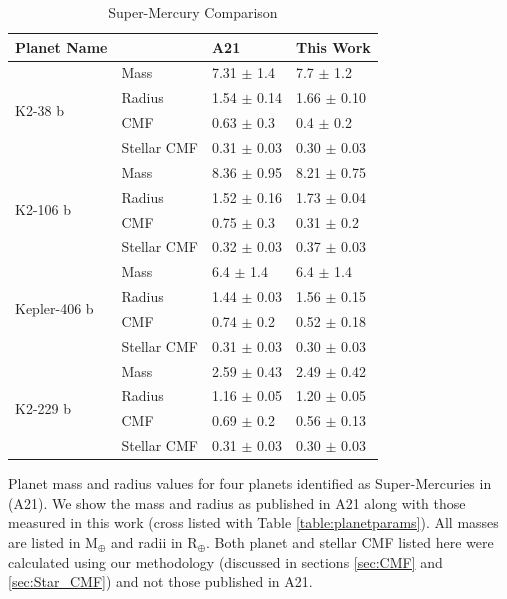 \documentclass[twocolumn]{aastex631}
\begin{document}
\begin{table}[]
\begin{flushleft}

\caption{Super-Mercury Comparison}
\label{table:mercuries}
\begin{tabular}{|l|l|l|l|}
\hline
 Planet Name                  &              & A21         & This Work      \\\hline
 \multirow{4}{*}{K2-38 b}     & Mass         & 7.31 $\pm$ 1.4  & 7.7 $\pm$ 1.2  \\\cline{2-4}
                              & Radius       & 1.54 $\pm$ 0.14 & 1.66 $\pm$ 0.10  \\\cline{2-4}
                              & CMF          & 0.63 $\pm$ 0.3   & 0.4 $\pm$ 0.2    \\\cline{2-4}
                              & Stellar CMF  & 0.31 $\pm$ 0.03 & 0.30 $\pm$ 0.03 \\\hline
\multirow{4}{*}{K2-106 b}     & Mass         & 8.36 $\pm$ 0.95 & 8.21 $\pm$ 0.75  \\\cline{2-4}
                              & Radius       & 1.52 $\pm$ 0.16 & 1.73 $\pm$ 0.04  \\\cline{2-4}
                              & CMF          & 0.75 $\pm$ 0.3  & 0.31  $\pm$ 0.2   \\\cline{2-4}
                              & Stellar CMF  & 0.32 $\pm$ 0.03 & 0.37 $\pm$ 0.03  \\\hline
\multirow{4}{*}{Kepler-406 b} & Mass         & 6.4 $\pm$ 1.4   & 6.4 $\pm$ 1.4 \\\cline{2-4}
                              & Radius       & 1.44 $\pm$ 0.03 & 1.56 $\pm$ 0.15 \\\cline{2-4}
                              & CMF          & 0.74 $\pm$ 0.2  & 0.52 $\pm$ 0.18 \\\cline{2-4}
                              & Stellar CMF  & 0.31 $\pm$ 0.03 & 0.30 $\pm$ 0.03 \\\hline
\multirow{4}{*}{K2-229 b}     & Mass         & 2.59 $\pm$ 0.43 & 2.49 $\pm$ 0.42 \\\cline{2-4}
                              & Radius       & 1.16 $\pm$ 0.05 & 1.20 $\pm$ 0.05\\\cline{2-4}
                              & CMF          & 0.69 $\pm$ 0.2  & 0.56 $\pm$ 0.13 \\\cline{2-4}
                              & Stellar CMF  & 0.31 $\pm$ 0.03 & 0.30 $\pm$ 0.03 \\\hline

\end{tabular}
      \small
      Planet mass and radius values for four planets identified as Super-Mercuries in \cite{Adibekyan2021} (A21). We show the mass and radius as published in A21 along with those measured in this work (cross listed with Table \ref{table:planetparams}). All masses are listed in M$_{\oplus}$ and radii in R$_{\oplus}$. Both planet and stellar CMF listed here were calculated using our methodology (discussed in sections \ref{sec:CMF} and \ref{sec:Star_CMF}) and not those published in A21. 
\end{flushleft}


\end{table}
\end{document}
